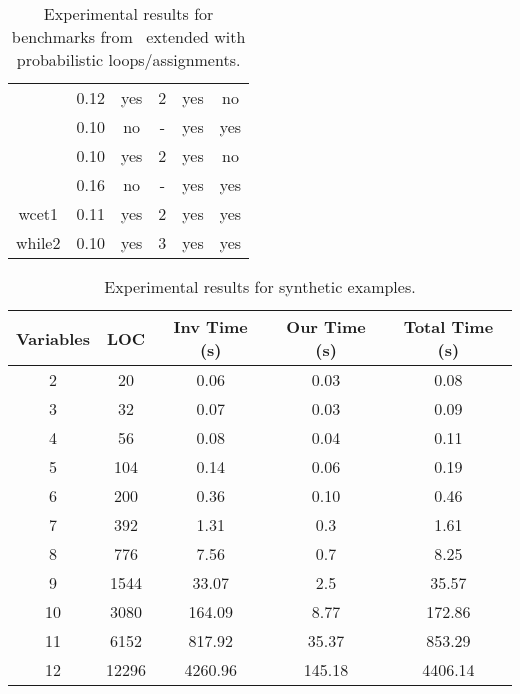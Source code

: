 \begin{center}
\begin{table}[]
\begin{tabular}{c|c|c|c|c|c}
{\multirow{2}{*}{speedSingleSingle2}} & {0.12} & {yes} & {2} & {yes} & {no} \\\cline{2-6}
{} & {0.10} & {no} & {-} & {yes} & {yes} \\\hline
{\multirow{2}{*}{unperfect}} & {0.10} & {yes} & {2} & {yes} & {no} \\\cline{2-6}
{} & {0.16} & {no} & {-} & {yes} & {yes} \\\hline
{wcet1} & {0.11} & {yes} & {2} & {yes} & {yes} \\\hline
{while2} & {0.10} & {yes} & {3} & {yes} & {yes} \\\hline
    
\end{tabular}
\caption{Experimental results for benchmarks from~\cite{ADFG10:lexicographic} extended with probabilistic loops/assignments.} \label{tab:exp1}
\vspace{-1.5em}
\end{table}
\end{center}

\begin{center}
\begin{table}[]
  \centering
   \begin{tabular}{c|c|c|c|c}

{Variables} & {LOC} & {Inv Time (s)} & {Our Time (s)} & {Total Time (s)} \\\hline \hline
{2} & {20} & {0.06} & {0.03} & {0.08} \\\hline
{3} & {32} & {0.07} & {0.03} & {0.09} \\\hline
{4} & {56} & {0.08} & {0.04} & {0.11} \\\hline
{5} & {104} & {0.14} & {0.06} & {0.19} \\\hline
{6} & {200} & {0.36} & {0.10} & {0.46} \\\hline
{7} & {392} & {1.31} & {0.3} & {1.61} \\\hline
{8} & {776} & {7.56} & {0.7} & {8.25} \\\hline
{9} & {1544} & {33.07} & {2.5} & {35.57} \\\hline
{10} & {3080} & {164.09} & {8.77} & {172.86} \\\hline
{11} & {6152} & {817.92} & {35.37} & {853.29} \\\hline
{12} & {12296} & {4260.96} & {145.18} & {4406.14} \\\hline
\end{tabular}
\caption{Experimental results for synthetic examples.}\label{tab:exp2}
\vspace{-2 em}
\end{table}
\end{center}

